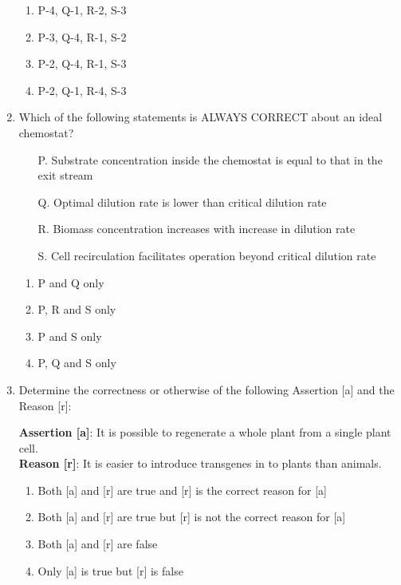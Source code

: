 \documentclass[12pt]{article}
\begin{document}
\begin{enumerate}[label=Q.\arabic*,start=26]
		\begin{enumerate}[label=(\Alph*)]
			\item P-4, Q-1, R-2, S-3
			\item P-3, Q-4, R-1, S-2
			\item P-2, Q-4, R-1, S-3
			\item P-2, Q-1, R-4, S-3
		\end{enumerate}

	\item Which of the following statements is ALWAYS CORRECT about an ideal chemostat?

		\begin{itemize}
			\item[P.] Substrate concentration inside the chemostat is equal to that in the exit stream
			\item[Q.] Optimal dilution rate is lower than critical dilution rate
			\item[R.] Biomass concentration increases with increase in dilution rate
			\item[S.] Cell recirculation facilitates operation beyond critical dilution rate
		\end{itemize}

		\begin{enumerate}[label=(\Alph*)]
			\item P and Q only
			\item P, R and S only
			\item P and S only
			\item P, Q and S only
		\end{enumerate}
		\newpage
	\item Determine the correctness or otherwise of the following Assertion [a] and the Reason [r]:

		\textbf{Assertion [a]}: It is possible to regenerate a whole plant from a single plant cell. \\
		\textbf{Reason [r]}: It is easier to introduce transgenes in to plants than animals.
		\begin{enumerate}[label=(\Alph*)]
			\item Both [a] and [r] are true and [r] is the correct reason for [a]
			\item Both [a] and [r] are true but [r] is not the correct reason for [a]
			\item Both [a] and [r] are false
			\item Only [a] is true but [r] is false
		\end{enumerate}


\end{enumerate}
\end{document}
